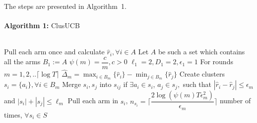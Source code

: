The steps are presented in Algorithm~1.\\%
\noindent\makebox[\linewidth]{\rule{\textwidth}{0.8pt}}\\[-0.1cm]
\textbf{Algorithm 1:} ClusUCB\\[-0.3cm]
\noindent\makebox[\linewidth]{\rule{\textwidth}{0.4pt}}\\[-0.3cm]
\begin{algorithmic}[1]
\State Pull each arm once and calculate $\hat{r}_{i}, \forall i\in A$
\State Let $A$ be such a set which contains all the arms
\State $B_{1}:=A$
\State $\psi(m)=\dfrac{c}{m}, c>0$
\State $\ell_{1}=2,D_{1}=2, \epsilon_{1}=1$
\State For rounds $m=1,2,.. \lceil\log T\rceil$
\State \hspace*{2em} $\hat{\Delta}_{m}=\max_{i\in B_{m}}{\lbrace\hat{r}_{i}\rbrace}-\min_{j\in B_{m}}{\lbrace\hat{r}_{j}\rbrace}$
\State \hspace*{2em} Create clusters $s_{i}=\lbrace a_{i}\rbrace, \forall i\in B_{m}$
\State \hspace*{2em} Merge $s_{i},s_{j}$ into $s_{ij}$ if $\exists a_{i}\in s_{i} $, $ a_{j}\in s_{j},$ such that $|\hat{r}_{i}-\hat{r}_{j}|\leq\epsilon_{m}$ and \hspace*{2em} $|s_{i}|+|s_{j}|\leq \ell_{m}$
\State \hspace*{2em} Pull each arm in $s_{i}$, \newline\hspace*{2em}$n_{s_{i}}=\bigg\lceil\dfrac{2\log{(\psi(m)T\epsilon_{m}^{2})}}{\epsilon_{m}}\bigg\rceil$ number of times, $\forall s_{i}\in S$ 

\end{algorithmic}
